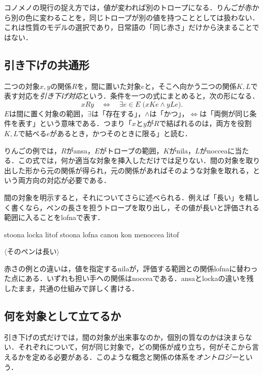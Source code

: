 \documentclass[b5paper, 10pt]{ltjsarticle}
\newcommand{\ko}[1]{\textsf{#1}}
\newcommand{\sentence}[1]{$\langle$#1$\rangle$}
\begin{document}
\begin{remark}
    コノメノの現行の捉え方では，値が変われば別のトロープになる．りんごが赤から別の色に変わることを，同じトロープが別の値を持つこととしては扱わない．これは性質のモデルの選択であり，日常語の「同じ赤さ」だけから決まることではない．
\end{remark}

\subsection{引き下げの共通形}
二つの対象$x,y$の関係$R$を，間に置いた対象$e$と，そこへ向かう二つの関係$K,L$で表す対応を\emph{引き下げ対応}という．条件を一つの式にまとめると，次の形になる．
\[
    xRy\quad\Longleftrightarrow\quad
    \exists e\in E\;\bigl(xKe\land yLe\bigr).
\]
$E$は間に置く対象の範囲，$\exists$は「存在する」，$\land$は「かつ」，$\Longleftrightarrow$は「両側が同じ条件を表す」という意味である．つまり「$x$と$y$が$R$で結ばれるのは，両方を役割$K,L$で結べる$e$があるとき，かつそのときに限る」と読む．

りんごの例では，$R$が\ko{ansa}，$E$がトロープの範囲，$K$が\ko{nila}，$L$が\ko{noccea}に当たる．この式では，何か適当な対象を挿入しただけでは足りない．間の対象を取り出した形から元の関係が得られ，元の関係があればそのような対象を取れる，という両方向の対応が必要である．

間の対象を明示すると，それについてさらに述べられる．例えば「長い」を精しく書くなら，ペンの長さを担うトロープを取り出し，その値が長いと評価される範囲に入ることを\ko{lofna}で表す．
\begin{exe}
    \ex\begin{xlist}
        \ex \ko{stoona locka litof}
        \ex \ko{stoona lofna canon kon menoccea litof}
    \end{xlist}
    \glt \sentence{そのペンは長い}
\end{exe}
赤さの例との違いは，値を指定する\ko{nila}が，評価する範囲との関係\ko{lofna}に替わった点にある．いずれも担い手への関係は\ko{noccea}である．\ko{ansa}と\ko{locka}の違いを残したまま，共通の仕組みで詳しく書ける．

\subsection{何を対象として立てるか}
引き下げの式だけでは，間の対象が出来事なのか，個別の質なのかは決まらない．それぞれについて，何が同じ対象で，どの関係が成り立ち，何がそこから言えるかを定める必要がある．このような概念と関係の体系を\emph{オントロジー}という．
\end{document}
